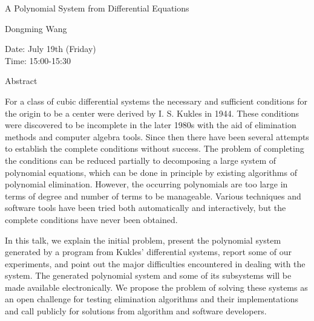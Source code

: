 \begin{center}
\LARGE
A Polynomial System from Differential Equations 
\end{center}

\begin{center}
\Large
Dongming Wang
\end{center}

\noindent
Date:  July 19th (Friday)\\
Time:  15:00-15:30\\

\begin{center}
\large
Abstract
\end{center}

For a class of cubic differential systems the necessary and sufficient conditions for the origin to be
a center were derived by I. S. Kukles in 1944. These conditions were discovered to be incomplete
in the later 1980s with the aid of elimination methods and computer algebra tools. Since then there
have been several attempts to establish the complete conditions without success. The problem of
completing the conditions can be reduced partially to decomposing a large system of polynomial
equations, which can be done in principle by existing algorithms of polynomial elimination.
However, the occurring polynomials are too large in terms of degree and number of terms to be
manageable. Various techniques and software tools have been tried both automatically and
interactively, but the complete conditions have never been obtained.

In this talk, we explain the initial problem, present the polynomial system generated by a program
from Kukles' differential systems, report some of our experiments, and point out the major
difficulties encountered in dealing with the system. The generated polynomial system and some of
its subsystems will be made available electronically. We propose the problem of solving these
systems as an open challenge for testing elimination algorithms and their implementations and call
publicly for solutions from algorithm and software developers. 

